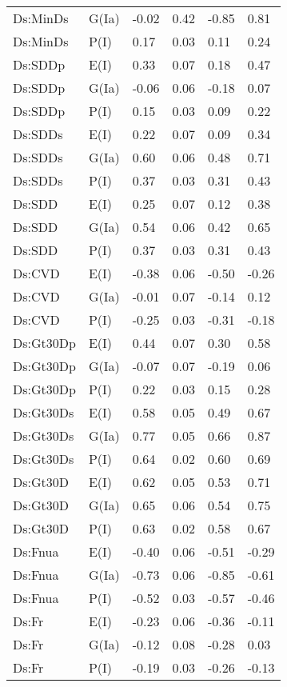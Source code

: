 \begin{center}
\begin{longtable}{|p{1.1in}|p{0.7in}|p{0.7in}|p{0.6in}|p{0.6in}|p{0.6in}|}
  Ds:MinDs & G(Ia) & -0.02 & 0.42 & -0.85 & 0.81 \\ 
  Ds:MinDs & P(I) & 0.17 & 0.03 & 0.11 & 0.24 \\ 
  Ds:SDDp & E(I) & 0.33 & 0.07 & 0.18 & 0.47 \\ 
  Ds:SDDp & G(Ia) & -0.06 & 0.06 & -0.18 & 0.07 \\ 
  Ds:SDDp & P(I) & 0.15 & 0.03 & 0.09 & 0.22 \\ 
  Ds:SDDs & E(I) & 0.22 & 0.07 & 0.09 & 0.34 \\ 
  Ds:SDDs & G(Ia) & 0.60 & 0.06 & 0.48 & 0.71 \\ 
  Ds:SDDs & P(I) & 0.37 & 0.03 & 0.31 & 0.43 \\ 
  Ds:SDD & E(I) & 0.25 & 0.07 & 0.12 & 0.38 \\ 
  Ds:SDD & G(Ia) & 0.54 & 0.06 & 0.42 & 0.65 \\ 
  Ds:SDD & P(I) & 0.37 & 0.03 & 0.31 & 0.43 \\ 
  Ds:CVD & E(I) & -0.38 & 0.06 & -0.50 & -0.26 \\ 
  Ds:CVD & G(Ia) & -0.01 & 0.07 & -0.14 & 0.12 \\ 
  Ds:CVD & P(I) & -0.25 & 0.03 & -0.31 & -0.18 \\ 
  Ds:Gt30Dp & E(I) & 0.44 & 0.07 & 0.30 & 0.58 \\ 
  Ds:Gt30Dp & G(Ia) & -0.07 & 0.07 & -0.19 & 0.06 \\ 
  Ds:Gt30Dp & P(I) & 0.22 & 0.03 & 0.15 & 0.28 \\ 
  Ds:Gt30Ds & E(I) & 0.58 & 0.05 & 0.49 & 0.67 \\ 
  Ds:Gt30Ds & G(Ia) & 0.77 & 0.05 & 0.66 & 0.87 \\ 
  Ds:Gt30Ds & P(I) & 0.64 & 0.02 & 0.60 & 0.69 \\ 
  Ds:Gt30D & E(I) & 0.62 & 0.05 & 0.53 & 0.71 \\ 
  Ds:Gt30D & G(Ia) & 0.65 & 0.06 & 0.54 & 0.75 \\ 
  Ds:Gt30D & P(I) & 0.63 & 0.02 & 0.58 & 0.67 \\ 
  Ds:Fnua & E(I) & -0.40 & 0.06 & -0.51 & -0.29 \\ 
  Ds:Fnua & G(Ia) & -0.73 & 0.06 & -0.85 & -0.61 \\ 
  Ds:Fnua & P(I) & -0.52 & 0.03 & -0.57 & -0.46 \\ 
  Ds:Fr & E(I) & -0.23 & 0.06 & -0.36 & -0.11 \\ 
  Ds:Fr & G(Ia) & -0.12 & 0.08 & -0.28 & 0.03 \\ 
  Ds:Fr & P(I) & -0.19 & 0.03 & -0.26 & -0.13 \\ 

\end{longtable}
\end{center}
